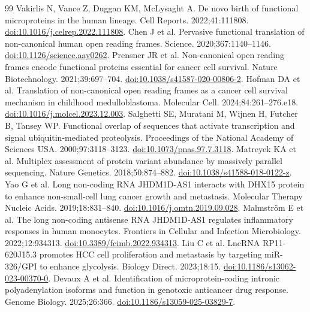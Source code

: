 \documentclass[11pt,a4paper]{article}
\begin{document}
\begin{thebibliography}{99}
 Vakirlis N, Vance Z, Duggan KM, McLysaght A. De novo birth of functional microproteins in the human lineage. Cell Reports. 2022;41:111808. \href{https://doi.org/10.1016/j.celrep.2022.111808}{doi:10.1016/j.celrep.2022.111808}.
 Chen J et al. Pervasive functional translation of non-canonical human open reading frames. Science. 2020;367:1140--1146. \href{https://doi.org/10.1126/science.aay0262}{doi:10.1126/science.aay0262}.
 Prensner JR et al. Non-canonical open reading frames encode functional proteins essential for cancer cell survival. Nature Biotechnology. 2021;39:697--704. \href{https://doi.org/10.1038/s41587-020-00806-2}{doi:10.1038/s41587-020-00806-2}.
 Hofman DA et al. Translation of non-canonical open reading frames as a cancer cell survival mechanism in childhood medulloblastoma. Molecular Cell. 2024;84:261--276.e18. \href{https://doi.org/10.1016/j.molcel.2023.12.003}{doi:10.1016/j.molcel.2023.12.003}.
 Salghetti SE, Muratani M, Wijnen H, Futcher B, Tansey WP. Functional overlap of sequences that activate transcription and signal ubiquitin-mediated proteolysis. Proceedings of the National Academy of Sciences USA. 2000;97:3118--3123. \href{https://doi.org/10.1073/pnas.97.7.3118}{doi:10.1073/pnas.97.7.3118}.
 Matreyek KA et al. Multiplex assessment of protein variant abundance by massively parallel sequencing. Nature Genetics. 2018;50:874--882. \href{https://doi.org/10.1038/s41588-018-0122-z}{doi:10.1038/s41588-018-0122-z}.
 Yao G et al. Long non-coding RNA JHDM1D-AS1 interacts with DHX15 protein to enhance non-small-cell lung cancer growth and metastasis. Molecular Therapy Nucleic Acids. 2019;18:831--840. \href{https://doi.org/10.1016/j.omtn.2019.09.028}{doi:10.1016/j.omtn.2019.09.028}.
 Malmstr{\"o}m E et al. The long non-coding antisense RNA JHDM1D-AS1 regulates inflammatory responses in human monocytes. Frontiers in Cellular and Infection Microbiology. 2022;12:934313. \href{https://doi.org/10.3389/fcimb.2022.934313}{doi:10.3389/fcimb.2022.934313}.
 Liu C et al. LncRNA RP11-620J15.3 promotes HCC cell proliferation and metastasis by targeting miR-326/GPI to enhance glycolysis. Biology Direct. 2023;18:15. \href{https://doi.org/10.1186/s13062-023-00370-0}{doi:10.1186/s13062-023-00370-0}.
 Devaux A et al. Identification of microprotein-coding intronic polyadenylation isoforms and function in genotoxic anticancer drug response. Genome Biology. 2025;26:366. \href{https://doi.org/10.1186/s13059-025-03829-7}{doi:10.1186/s13059-025-03829-7}.


\end{thebibliography}
\end{document}

